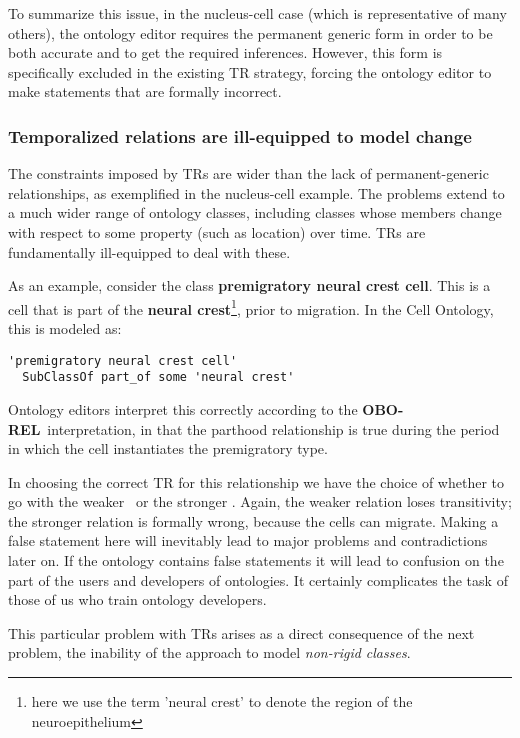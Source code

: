 \documentclass{bioinfo}
\def\atAllTimes{\pr{at-all-times}}
\def\atSomeTimes{\pr{at-some-times}}
\def\OBOREL{\textbf{OBO-REL}}
\begin{document}
To summarize this issue, in the nucleus-cell case (which is
representative of many others), the ontology editor requires the
permanent generic form in order to be both accurate and to get the
required inferences. However, this form is specifically excluded in
the existing TR strategy, forcing the ontology editor to make
statements that are formally incorrect.

\subsubsection{Temporalized relations are ill-equipped to model change}

The constraints imposed by TRs are wider than the lack of
permanent-generic relationships, as exemplified in the nucleus-cell
example. The problems extend to a much wider range of ontology
classes, including classes whose members change with respect to some
property (such as location) over time. TRs are fundamentally
ill-equipped to deal with these.

As an example, consider the class \textbf{premigratory neural crest
  cell}. This is a cell that is part of the \textbf{neural
  crest}\footnote{here we use the term 'neural crest' to denote the
  region of the neuroepithelium}, prior to migration. In the Cell
Ontology, this is modeled as:

\begin{verbatim}
'premigratory neural crest cell' 
  SubClassOf part_of some 'neural crest'
\end{verbatim}

Ontology editors interpret this correctly according to the \OBOREL\
interpretation, in that the parthood relationship is true during the
period in which the cell instantiates the premigratory type.

In choosing the correct TR for this relationship we have the choice of
whether to go with the weaker \atSomeTimes\ or the stronger
\atAllTimes. Again, the weaker relation loses transitivity; the
stronger relation is formally wrong, because the cells can
migrate. Making a false statement here will inevitably lead to major
problems and contradictions later on. If the ontology contains false
statements it will lead to confusion on the part of the users and
developers of ontologies. It certainly complicates the task of those
of us who train ontology developers.

This particular problem with TRs arises as a direct consequence of the
next problem, the inability of the approach to model \emph{non-rigid
  classes}.
\end{document}
